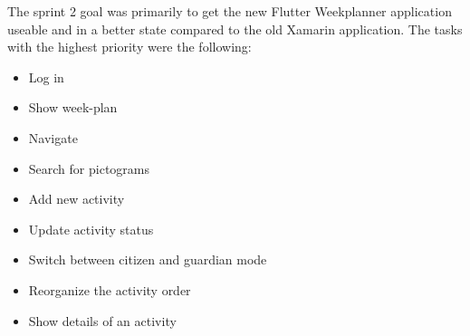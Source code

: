 The sprint 2 goal was primarily to get the new Flutter Weekplanner application useable and in a better state compared to the old Xamarin application. The tasks with the highest priority were the following:

\begin{itemize}
    \item Log in
    \item Show week-plan
    \item Navigate
    \item Search for pictograms
    \item Add new activity
    \item Update activity status
    \item Switch between citizen and guardian mode
    \item Reorganize the activity order
    \item Show details of an activity
\end{itemize}
